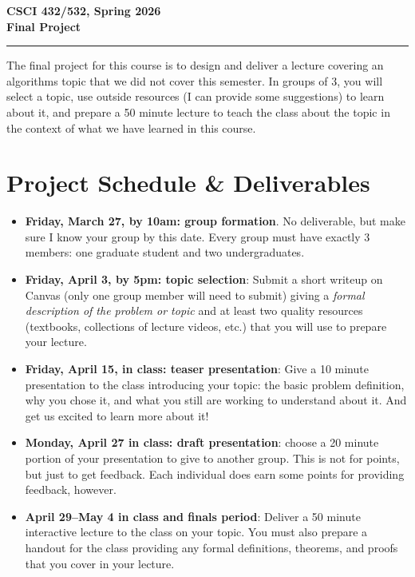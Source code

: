 \documentclass[11pt]{article}
\begin{document}
\begin{center}
\Large\textbf{CSCI 432/532, Spring 2026}%
\\
\LARGE\textbf{Final Project}%
\end{center}

\bigskip
\hrule
\bigskip

The final project for this course is to design and deliver a lecture covering an algorithms topic that we did not
cover this semester. In groups of 3, you will select a topic, use outside resources
(I can provide some suggestions) to learn about it, and prepare a 50 minute lecture
to teach the class about the topic in the context of what we have learned in this course.

\section{Project Schedule \& Deliverables}
\begin{itemize}
    \item \textbf{Friday, March 27, by 10am: group formation}. No deliverable, but make sure I know your group by this date.
    Every group must have exactly 3 members: one graduate student and two undergraduates.
    \item \textbf{Friday, April 3, by 5pm: topic selection}: Submit a short writeup on Canvas (only one group member will need to submit) giving a \emph{formal description of the problem or topic} and
    at least two quality resources (textbooks, collections of lecture videos, etc.) that you will use to prepare your lecture.
    \item \textbf{Friday, April 15, in class: teaser presentation}: Give a 10 minute presentation to the class
    introducing your topic: the basic problem definition, why you chose it, and what
    you still are working to understand about it. And get us excited to learn more about it!
    \item \textbf{Monday, April 27 in class: draft presentation}: choose a 20 minute portion of your presentation
    to give to another group. This is not for points, but just to get feedback. Each individual does earn some
    points for providing feedback, however.
    \item \textbf{April 29--May 4 in class and finals period}: Deliver a 50 minute interactive lecture to the class on your topic. You must also
    prepare a handout for the class providing any formal definitions, theorems,
    and proofs that you cover in your lecture.
\end{itemize}
\end{document}
